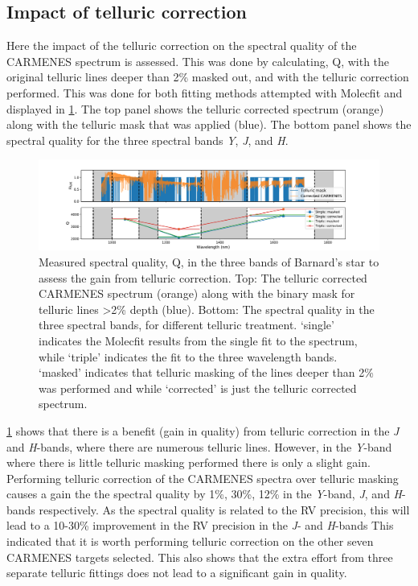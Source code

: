 \subsection{Impact of telluric correction}
\label{subsec:impact_telluric_correction}
Here the impact of the telluric correction on the spectral quality of the CARMENES spectrum is assessed.
This was done by calculating, Q, with the original telluric lines deeper than 2\% masked out, and with the telluric correction performed.
This was done for both fitting methods attempted with Molecfit and displayed in \cref{fig:band_qualityfromapplyingtelluriccorrection}.
The top panel shows the telluric corrected spectrum (orange) along with the telluric mask that was applied (blue).
The bottom panel shows the spectral quality for the three spectral bands \emph{Y}, \emph{J}, and \emph{H}.

\begin{figure}
    \centering
    \includegraphics[width=0.8\linewidth]{figures/information-content/Carmenes/Band_quality_from_applying_telluric_correction}
    \caption[Barnard's star spectral quality.]{Measured spectral quality, Q, in the three \nir{} bands of Barnard's star to assess the gain from telluric correction. 
        Top: The telluric corrected CARMENES spectrum (orange) along with the binary mask for telluric lines >2\% depth (blue). 
        Bottom: The spectral quality in the three spectral bands, for different telluric treatment. `single' indicates the Molecfit results from the single fit to the spectrum, while `triple' indicates the fit to the three wavelength bands.
        `masked' indicates that telluric masking of the lines deeper than 2\% was performed and while `corrected' is just the telluric corrected spectrum.}
    \label{fig:band_qualityfromapplyingtelluriccorrection}
\end{figure}

\cref{fig:band_qualityfromapplyingtelluriccorrection} shows that there is a benefit (gain in quality) from telluric correction in the \emph{J} and \emph{H}-bands, where there are numerous telluric lines.
However, in the \emph{Y}-band where there is little telluric masking performed there is only a slight gain.
Performing telluric correction of the CARMENES spectra over telluric masking causes a gain the the spectral quality by 1\%, 30\%, 12\% in the \emph{Y}-band, \emph{J}, and \emph{H}-bands respectively.
As the spectral quality is related to the RV precision, this will lead to a 10-30\% improvement in the RV precision in the \emph{J}- and \emph{H}-bands
This indicated that it is worth performing telluric correction on the other seven {CARMENES} targets selected.
This also shows that the extra effort from three separate telluric fittings does not lead to a significant gain in quality.


